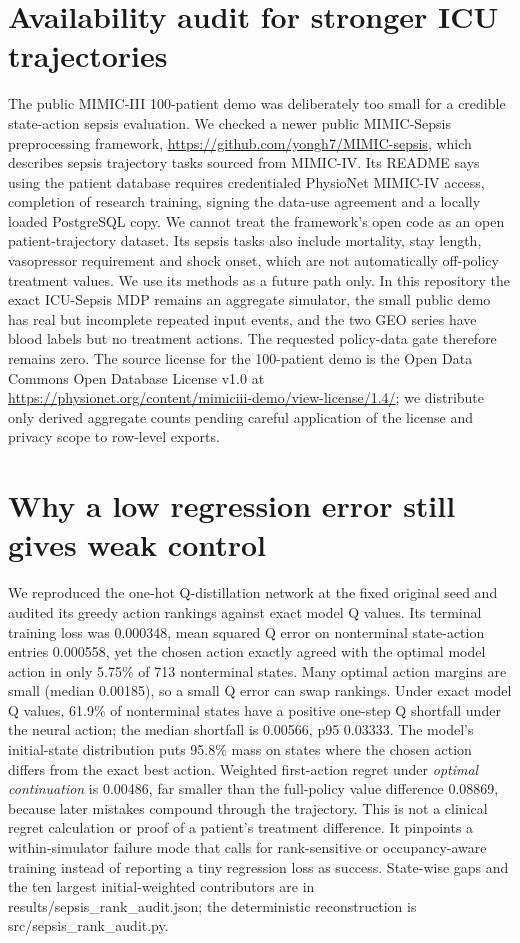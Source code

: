 \section{Availability audit for stronger ICU trajectories}
The public MIMIC-III 100-patient demo was deliberately too small for a credible state-action sepsis evaluation. We checked a newer public MIMIC-Sepsis preprocessing framework, \url{https://github.com/yongh7/MIMIC-sepsis}, which describes sepsis trajectory tasks sourced from MIMIC-IV. Its README says using the patient database requires credentialed PhysioNet MIMIC-IV access, completion of research training, signing the data-use agreement and a locally loaded PostgreSQL copy. We cannot treat the framework's open code as an open patient-trajectory dataset. Its sepsis tasks also include mortality, stay length, vasopressor requirement and shock onset, which are not automatically off-policy treatment values. We use its methods as a future path only. In this repository the exact ICU-Sepsis MDP remains an aggregate simulator, the small public demo has real but incomplete repeated input events, and the two GEO series have blood labels but no treatment actions. The requested policy-data gate therefore remains zero. The source license for the 100-patient demo is the Open Data Commons Open Database License v1.0 at \url{https://physionet.org/content/mimiciii-demo/view-license/1.4/}; we distribute only derived aggregate counts pending careful application of the license and privacy scope to row-level exports.

\section{Why a low regression error still gives weak control}
We reproduced the one-hot Q-distillation network at the fixed original seed and audited its greedy action rankings against exact model Q values. Its terminal training loss was 0.000348, mean squared Q error on nonterminal state-action entries 0.000558, yet the chosen action exactly agreed with the optimal model action in only 5.75\% of 713 nonterminal states. Many optimal action margins are small (median 0.00185), so a small Q error can swap rankings. Under exact model Q values, 61.9\% of nonterminal states have a positive one-step Q shortfall under the neural action; the median shortfall is 0.00566, p95 0.03333. The model's initial-state distribution puts 95.8\% mass on states where the chosen action differs from the exact best action. Weighted first-action regret under \emph{optimal continuation} is 0.00486, far smaller than the full-policy value difference 0.08869, because later mistakes compound through the trajectory. This is not a clinical regret calculation or proof of a patient's treatment difference. It pinpoints a within-simulator failure mode that calls for rank-sensitive or occupancy-aware training instead of reporting a tiny regression loss as success. State-wise gaps and the ten largest initial-weighted contributors are in results/sepsis\_rank\_audit.json; the deterministic reconstruction is src/sepsis\_rank\_audit.py.

